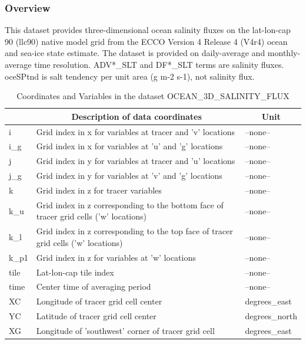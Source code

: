 \subsubsection{Overview}
This dataset provides three-dimensional ocean salinity fluxes on the lat-lon-cap 90 (llc90) native model grid from the ECCO Version 4 Release 4 (V4r4) ocean and sea-ice state estimate. The dataset is provided on daily-average and monthly-average time resolution. ADV*\_SLT and DF*\_SLT terms are salinity fluxes. oceSPtnd is salt tendency per unit area (g m-2 s-1), not salinity flux. 
\begin{longtable}{|m{}|m{}|m{}|}
\caption{Coordinates and Variables in the dataset OCEAN\_3D\_SALINITY\_FLUX}
\label{tab:table-OCEAN_3D_SALINITY_FLUX-fields} \\ 
\hline \endhead \hline \endfoot
\rowcolor{lightgray} \multicolumn{1}{|c|}{\textbf{Coordinates}} & \multicolumn{1}{|c|}{\textbf{Description of data coordinates}} &  \multicolumn{1}{|c|}{\textbf{Unit}}\\ \hline
i &Grid index in x for variables at tracer and 'v' locations &--none--  \\ \hline
i\_g &Grid index in x for variables at 'u' and 'g' locations &--none--  \\ \hline
j &Grid index in y for variables at tracer and 'u' locations &--none--  \\ \hline
j\_g &Grid index in y for variables at 'v' and 'g' locations &--none--  \\ \hline
k &Grid index in z for tracer variables &--none--  \\ \hline
k\_u &Grid index in z corresponding to the bottom face of tracer grid cells ('w' locations) &--none--  \\ \hline
k\_l &Grid index in z corresponding to the top face of tracer grid cells ('w' locations) &--none--  \\ \hline
k\_p1 &Grid index in z for variables at 'w' locations &--none--  \\ \hline
tile &Lat-lon-cap tile index &--none--  \\ \hline
time &Center time of averaging period &--none--  \\ \hline
XC &Longitude of tracer grid cell center &degrees\_east  \\ \hline
YC &Latitude of tracer grid cell center &degrees\_north  \\ \hline
XG &Longitude of 'southwest' corner of tracer grid cell &degrees\_east  \\ \hline

\end{longtable}
